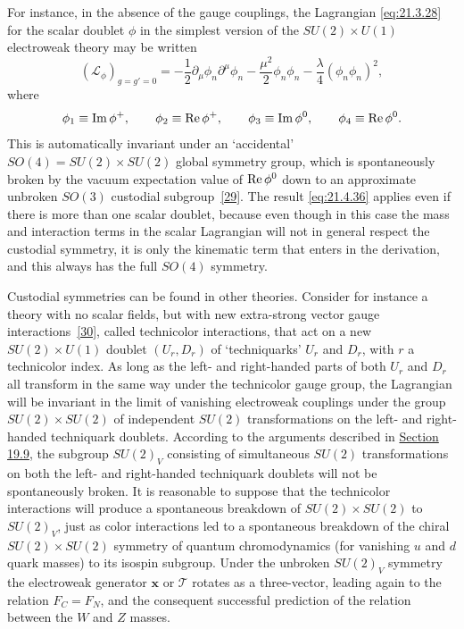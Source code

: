 For instance, in the absence of the gauge couplings, the Lagrangian \eqref{eq:21.3.28} for the scalar doublet $\phi$ in the simplest version of the $SU(2)\times U(1)$ electroweak theory may be written
\[
\left(\mathcal L_\phi\right)_{g=g'=0}
=-\frac{1}{2}\partial_\mu\phi_n\partial^\mu\phi_n
-\frac{\mu^2}{2}\phi_n\phi_n
-\frac{\lambda}{4}(\phi_n\phi_n)^2,
\]
where
\[
\phi_1\equiv\mathop{\rm Im}\phi^+,
\qquad
\phi_2\equiv\mathop{\rm Re}\phi^+,
\qquad
\phi_3\equiv\mathop{\rm Im}\phi^0,
\qquad
\phi_4\equiv\mathop{\rm Re}\phi^0.
\]
This is automatically invariant under an `accidental' $SO(4)=SU(2)\times SU(2)$ global symmetry group, which is spontaneously broken by the vacuum expectation value of $\mathop{\rm Re}\phi^0$ down to an approximate unbroken $SO(3)$ custodial subgroup~\hyperref[ch21-ref-29]{[29]}. The result \eqref{eq:21.4.36} applies even if there is more than one scalar doublet, because even though in this case the mass and interaction terms in the scalar Lagrangian will not in general respect the custodial symmetry, it is only the kinematic term that enters in the derivation, and this always has the full $SO(4)$ symmetry.

Custodial symmetries can be found in other theories. Consider for instance a theory with no scalar fields, but with new extra-strong vector gauge interactions~\hyperref[ch21-ref-30]{[30]}, called technicolor interactions, that act on a new $SU(2)\times U(1)$ doublet $(U_r,D_r)$ of `techniquarks' $U_r$ and $D_r$, with $r$ a technicolor index. As long as the left- and right-handed parts of both $U_r$ and $D_r$ all transform in the same way under the technicolor gauge group, the Lagrangian will be invariant in the limit of vanishing electroweak couplings under the group $SU(2)\times SU(2)$ of independent $SU(2)$ transformations on the left- and right-handed techniquark doublets. According to the arguments described in \hyperref[sec:19.9]{Section 19.9}, the subgroup $SU(2)_V$ consisting of simultaneous $SU(2)$ transformations on both the left- and right-handed techniquark doublets will not be spontaneously broken. It is reasonable to suppose that the technicolor interactions will produce a spontaneous breakdown of $SU(2)\times SU(2)$ to $SU(2)_V$, just as color interactions led to a spontaneous breakdown of the chiral $SU(2)\times SU(2)$ symmetry of quantum chromodynamics (for vanishing $u$ and $d$ quark masses) to its isospin subgroup. Under the unbroken $SU(2)_V$ symmetry the electroweak generator $\mathbf{x}$ or $\mathbf{\mathcal T}$ rotates as a three-vector, leading again to the relation $F_C=F_N$, and the consequent successful prediction of the relation between the $W$ and $Z$ masses.

